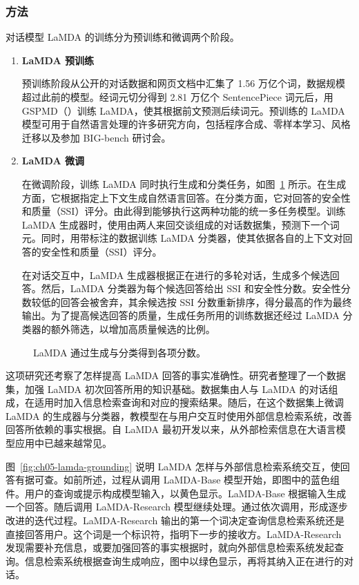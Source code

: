 \subsubsection{方法}
对话模型 LaMDA 的训练分为预训练和微调两个阶段。

\begin{enumerate}
\item \textbf{LaMDA 预训练}

预训练阶段从公开的对话数据和网页文档中汇集了 1.56 万亿个词，数据规模超过此前的模型。经词元切分得到 2.81 万亿个 SentencePiece 词元后，用 GSPMD（）训练 LaMDA，使其根据前文预测后续词元。预训练的 LaMDA 模型可用于自然语言处理的许多研究方向，包括程序合成、零样本学习、风格迁移以及参加 BIG-bench 研讨会。

\item \textbf{LaMDA 微调}

在微调阶段，训练 LaMDA 同时执行生成和分类任务，如图~\ref{fig:ch05-lamda-classifiers} 所示。在生成方面，它根据指定上下文生成自然语言回答。在分类方面，它对回答的安全性和质量（SSI）评分。由此得到能够执行这两种功能的统一多任务模型。训练 LaMDA 生成器时，使用由两人来回交谈组成的对话数据集，预测下一个词元。同时，用带标注的数据训练 LaMDA 分类器，使其依据各自的上下文对回答的安全性和质量（SSI）评分。

在对话交互中，LaMDA 生成器根据正在进行的多轮对话，生成多个候选回答。然后，LaMDA 分类器为每个候选回答给出 SSI 和安全性分数。安全性分数较低的回答会被舍弃，其余候选按 SSI 分数重新排序，得分最高的作为最终输出。为了提高候选回答的质量，生成任务所用的训练数据还经过 LaMDA 分类器的额外筛选，以增加高质量候选的比例。
\end{enumerate}

\begin{figure}[!htbp]
\centering

\caption{LaMDA 通过生成与分类得到各项分数。}
\label{fig:ch05-lamda-classifiers}
\end{figure}

这项研究还考察了怎样提高 LaMDA 回答的事实准确性。研究者整理了一个数据集，加强 LaMDA 初次回答所用的知识基础。数据集由人与 LaMDA 的对话组成，在适用时加入信息检索查询和对应的搜索结果。随后，在这个数据集上微调 LaMDA 的生成器与分类器，教模型在与用户交互时使用外部信息检索系统，改善回答所依赖的事实根据。自 LaMDA 最初开发以来，从外部检索信息在大语言模型应用中已越来越常见。

图~\ref{fig:ch05-lamda-grounding} 说明 LaMDA 怎样与外部信息检索系统交互，使回答有据可查。如前所述，过程从调用 LaMDA-Base 模型开始，即图中的蓝色组件。用户的查询或提示构成模型输入，以黄色显示。LaMDA-Base 根据输入生成一个回答。随后调用 LaMDA-Research 模型继续处理。通过依次调用，形成逐步改进的迭代过程。LaMDA-Research 输出的第一个词决定查询信息检索系统还是直接回答用户。这个词是一个标识符，指明下一步的接收方。LaMDA-Research 发现需要补充信息，或要加强回答的事实根据时，就向外部信息检索系统发起查询。信息检索系统根据查询生成响应，图中以绿色显示，再将其纳入正在进行的对话。

